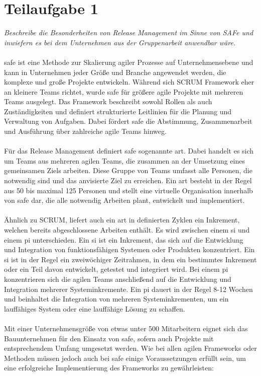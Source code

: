 \chapter{Teilaufgabe 1}

\textit{Beschreibe die Besonderheiten von Release Management im Sinne von SAFe und inwiefern es bei dem Unternehmen aus der Gruppenarbeit anwendbar wäre.}
\\
\\
\ac{safe} ist eine Methode zur Skalierung agiler Prozesse auf Unternehmensebene und kann in Unternehmen jeder Größe und Branche angewendet werden, die komplexe und große Projekte entwickeln. Während sich SCRUM Framework eher an kleinere Teams richtet, wurde \ac{safe} für größere agile Projekte mit mehreren Teams ausgelegt. Das Framework beschreibt sowohl Rollen als auch Zuständigkeiten und definiert strukturierte Leitlinien für die Planung und Verwaltung von Aufgaben. Dabei fördert \ac{safe} die Abstimmung, Zusammenarbeit und Ausführung über zahlreiche agile Teams hinweg. {\cite{ref01}}
\\
\\
Für das Release Management definiert \ac{safe} sogenannte \ac{art}. Dabei handelt es sich um Teams aus mehreren agilen Teams, die zusammen an der Umsetzung eines gemeinsamen Ziels arbeiten. Diese Gruppe von Teams umfasst alle Personen, die notwendig sind und das anvisierte Ziel zu erreichen. Ein \ac{art} besteht in der Regel aus 50 bis maximal 125 Personen und stellt eine virtuelle Organisation innerhalb von \ac{safe} dar, die alle notwendig Arbeiten plant, entwickelt und implementiert. {\cite{ref02}}
\\
\\
Ähnlich zu SCRUM, liefert auch ein \ac{art} in definierten Zyklen ein Inkrement, welchen bereits abgeschlossene Arbeiten enthält. Es wird zwischen einem \ac{si} und einem \ac{pi} unterschieden. Ein \ac{si} ist ein Inkrement, das sich auf die Entwicklung und Integration von funktionsfähigen Systemen oder Produkten konzentriert. Ein \ac{si} ist in der Regel ein zweiwöchiger Zeitrahmen, in dem ein bestimmtes Inkrement oder ein Teil davon entwickelt, getestet und integriert wird. Bei einem \ac{pi} konzentrieren sich die agilen Teams anschließend auf die Entwicklung und Integration mehrerer Systeminkremente. Ein \ac{pi} dauert in der Regel 8-12 Wochen und beinhaltet die Integration von mehreren Systeminkrementen, um ein lauffähiges System oder eine lauffähige Lösung zu schaffen. {\cite{ref03}}
\\
\\
Mit einer Unternehmensgröße von etwas unter 500 Mitarbeitern eignet sich das Bauunternehmen für den Einsatz von \ac{safe}, sofern auch Projekte mit entsprechendem Umfang umgesetzt werden. Wie bei allen agilen Frameworks oder Methoden müssen jedoch auch bei \ac{safe} einige Voraussetzungen erfüllt sein, um eine erfolgreiche Implementierung des Frameworks zu gewährleisten:

